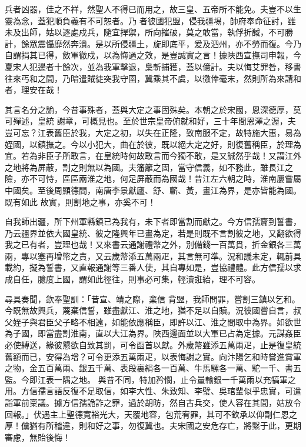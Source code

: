 \begin{pinyinscope}
 兵者凶器，佳之不祥，然聖人不得已而用之，故三皇、五帝所不能免。夫豈不以生靈為念，蓋犯順負義有不可恕者。乃
 者彼國犯盟，侵我疆埸，帥府奉命征討，雖未及出師，姑以逐處戍兵，隨宜捍禦，所向摧破，莫之敢當，執俘折馘，不可勝計，餘眾震懾靡然奔潰。是以所侵疆土，旋即底平，爰及泗州，亦不勞而復。今乃自謂捐其已得，斂軍徹戍，以為悔過之效，是豈誠實之言！據陜西宣撫司申報，今夏宋人犯邊者十餘次，並為我軍擊退，梟斬捕獲，蓋以億計。夫以悔艾罪咎，移書往來丐和之間，乃暗遣賊徒突我守圉，冀乘其不虞，以徼倖毫末，然則所為來請和者，理安在哉！



 其言名分之諭，今昔事殊者，蓋與大定之事固殊矣。本朝之於宋國，恩深德厚，莫可殫述，皇統
 謝章，可概見也。至於世宗皇帝俯就和好，三十年間恩澤之渥，夫豈可忘？江表舊臣於我，大定之初，以失在正隆，致南服不定，故特施大惠，易為姪國，以鎮撫之。今以小犯大，曲在於彼，既以絕大定之好，則復舊稱臣，於理為宜。若為非臣子所敢言，在皇統時何故敢言而今獨不敢，是又誠然乎哉！又謂江外之地將為屏蔽，割之則無以為國。夫籓籬之固，當守信義，如不務此，雖長江之險，亦不可恃，區區兩淮之地，何足屏蔽而為國哉！昔江左六朝之時，淮南屢嘗屬中國矣。至後周顯德間，南唐李景獻廬、舒、蘄、黃，畫江為界，是亦皆能為國。既有如此
 故實，則割地之事，亦奚不可！



 自我師出疆，所下州軍縣鎮已為我有，未下者即當割而獻之。今方信孺齎到誓書，乃云疆界並依大國皇統、彼之隆興年已畫為定，若是則既不言割彼之地，又翻欲得我之已有者，豈理也哉！又來書云通謝禮幣之外，別備錢一百萬貫，折金銀各三萬兩，專以塞再增幣之責，又云歲幣添五萬兩疋，其言無可準。況和議未定，輒前具載約，擬為誓書，又直報通謝等三番人使，其自專如是，豈協禮體。此方信孺以求成自任，臆度上國，謂如此徑往，則事必可集，輕瀆誑紿，理不可容。



 尋具奏聞，欽奉聖訓：「昔宣、靖之際，棄信
 背盟，我師問罪，嘗割三鎮以乞和。今既無故興兵，蔑棄信誓，雖盡獻江、淮之地，猶不足以自贖。況彼國嘗自言，叔父姪子與君臣父子略不相遠，如能依應稱臣，即許以江、淮之間取中為界。如欲世為子國，即當盡割淮南，直以大江為界。陜西邊面並以大軍已占為定據。元謀姦臣必使縛送，緣彼懇欲自致其罰，可令函首以獻。外歲幣雖添五萬兩疋，止是復皇統舊額而已，安得為增？可令更添五萬兩疋，以表悔謝之實。向汴陽乞和時嘗進賞軍之物，金五百萬兩、銀五千萬、表段裏絹各一百萬、牛馬騾各一萬、駝一千、書五監。今即江表一隅之地。
 與昔不同，特加矜憫，止令量輸銀一千萬兩以充犒軍之用。方信孺言語反復不足取信，如李大性、朱致知、李璧、吳琯輩似乎忠實，可遣詣軍前稟議。據方信孺詭詐之罪，過於胡昉，然自古兵交，使人容在其間，姑放令回報。」伏遇主上聖德寬裕光大，天覆地容，包荒宥罪，其可不欽承以仰副仁恩之厚！儻猶有所稽違，則和好之事，勿復冀也。夫宋國之安危存亡，將繫于此，更期審慮，無貽後悔！




\end{pinyinscope}
